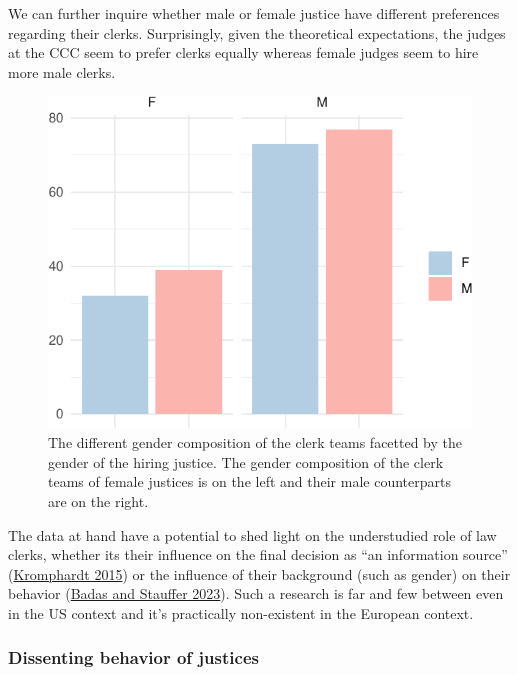 \documentclass[
  11pt,
]{article}
\begin{document}
We can further inquire whether male or female justice have different
preferences regarding their clerks. Surprisingly, given the theoretical
expectations, the judges at the CCC seem to prefer clerks equally
whereas female judges seem to hire more male clerks.

\begin{figure}
\centering
\includegraphics{ANONYMIZED_The_Czech_Constitutional_Court_Dataset_files/figure-latex/gender2-1.pdf}
\caption{The different gender composition of the clerk teams facetted by
the gender of the hiring justice. The gender composition of the clerk
teams of female justices is on the left and their male counterparts are
on the right.}
\end{figure}

The data at hand have a potential to shed light on the understudied role
of law clerks, whether its their influence on the final decision as ``an
information source''
(\protect\hyperlink{ref-kromphardtUSSupremeCourt2015}{Kromphardt 2015})
or the influence of their background (such as gender) on their behavior
(\protect\hyperlink{ref-badasGenderAmbitionPotential2023}{Badas and
Stauffer 2023}). Such a research is far and few between even in the US
context and it's practically non-existent in the European context.

\hypertarget{dissenting-behavior-of-justices}{%
\subsubsection{Dissenting behavior of
justices}\label{dissenting-behavior-of-justices}}
\end{document}
